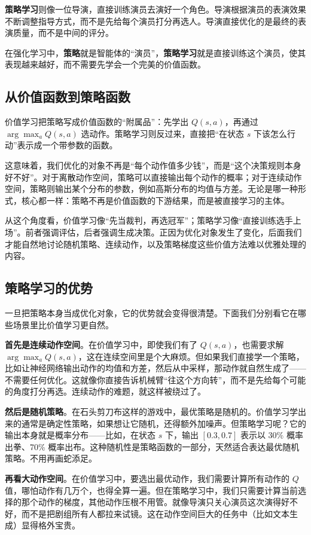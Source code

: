 \documentclass[lang=cn,zihao=-4,a4paper,fontset=windows]{beautybook}
\begin{document}
\textbf{策略学习}则像一位导演，直接训练演员去演好一个角色。导演根据演员的表演效果不断调整指导方式，而不是先给每个演员打分再选人。导演直接优化的是最终的表演质量，而不是中间的评分。

在强化学习中，\textbf{策略}就是智能体的“演员”，\textbf{策略学习}就是直接训练这个演员，使其表现越来越好，而不需要先学会一个完美的价值函数。

\subsection{从价值函数到策略函数}

价值学习把策略写成价值函数的“附属品”：先学出 \(Q(s,a)\)，再通过 \(\arg\max_a Q(s,a)\) 选动作。策略学习则反过来，直接把“在状态 \(s\) 下该怎么行动”表示成一个带参数的函数。

这意味着，我们优化的对象不再是“每个动作值多少钱”，而是“这个决策规则本身好不好”。对于离散动作空间，策略可以直接输出每个动作的概率；对于连续动作空间，策略则输出某个分布的参数，例如高斯分布的均值与方差。无论是哪一种形式，核心都一样：策略不再是价值函数的下游结果，而是被直接学习的主体。

从这个角度看，价值学习像“先当裁判，再选冠军”；策略学习像“直接训练选手上场”。前者强调评估，后者强调生成决策。正因为优化对象发生了变化，后面我们才能自然地讨论随机策略、连续动作，以及策略梯度这些价值方法难以优雅处理的内容。

\subsection{策略学习的优势}

一旦把策略本身当成优化对象，它的优势就会变得很清楚。下面我们分别看它在哪些场景里比价值学习更自然。

\textbf{首先是连续动作空间}。在价值学习中，即使我们有了 \(Q(s,a)\)，也需要求解 \(\arg\max_a Q(s,a)\)，这在连续空间里是个大麻烦。但如果我们直接学一个策略，比如让神经网络输出动作的均值和方差，然后从中采样，那动作就自然生成了——不需要任何优化。这就像你直接告诉机械臂“往这个方向转”，而不是先给每个可能的角度打分再选。连续动作的难题，就这样被绕过了。

\textbf{然后是随机策略}。在石头剪刀布这样的游戏中，最优策略是随机的。价值学习学出来的通常是确定性策略，如果想让它随机，还得额外加噪声。但策略学习呢？它的输出本身就是概率分布——比如，在状态 \(s\) 下，输出 \([0.3, 0.7]\) 表示以 30\% 概率出拳、70\% 概率出布。这种随机性是策略函数的一部分，天然适合表达最优随机策略。不用再画蛇添足。

\textbf{再看大动作空间}。在价值学习中，要选出最优动作，我们需要计算所有动作的 \(Q\) 值，哪怕动作有几万个，也得全算一遍。但在策略学习中，我们只需要计算当前选择的那个动作的梯度，其他动作压根不用管。就像导演只关心演员这次演得好不好，而不是把剧组所有人都拉来试镜。这在动作空间巨大的任务中（比如文本生成）显得格外宝贵。
\end{document}
